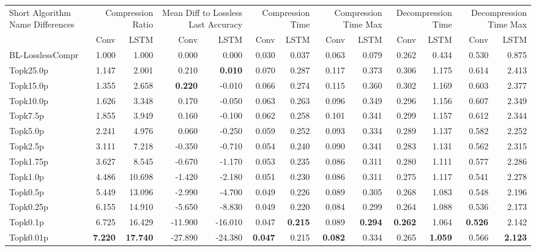 \begin{tabular}{lrrrrrrrrrrrr}
\toprule
\multicolumn{1}{p{2.5cm}}{Short Algorithm Name Differences} & \multicolumn{2}{p{1.8cm}}{Compression Ratio} & \multicolumn{2}{p{1.8cm}}{Mean Diff to Lossless Last Accuracy} & \multicolumn{2}{p{1.8cm}}{Compression Time} & \multicolumn{2}{p{1.8cm}}{Compression Time Max} & \multicolumn{2}{p{1.8cm}}{Decompression Time} & \multicolumn{2}{p{1.8cm}}{Decompression Time Max} \\
 & Conv & LSTM & Conv & LSTM & Conv & LSTM & Conv & LSTM & Conv & LSTM & Conv & LSTM \\
\midrule
BL-LosslessCompr & 1.000 & 1.000 & 0.000 & 0.000 & 0.030 & 0.037 & 0.063 & 0.079 & 0.262 & 0.434 & 0.530 & 0.875 \\
Topk25.0p & 1.147 & 2.001 & 0.210 & \bfseries 0.010 & 0.070 & 0.287 & 0.117 & 0.373 & 0.306 & 1.175 & 0.614 & 2.413 \\
Topk15.0p & 1.355 & 2.658 & \bfseries 0.220 & -0.010 & 0.066 & 0.274 & 0.115 & 0.360 & 0.302 & 1.169 & 0.603 & 2.377 \\
Topk10.0p & 1.626 & 3.348 & 0.170 & -0.050 & 0.063 & 0.263 & 0.096 & 0.349 & 0.296 & 1.156 & 0.607 & 2.349 \\
Topk7.5p & 1.855 & 3.949 & 0.160 & -0.100 & 0.062 & 0.258 & 0.101 & 0.341 & 0.299 & 1.157 & 0.612 & 2.344 \\
Topk5.0p & 2.241 & 4.976 & 0.060 & -0.250 & 0.059 & 0.252 & 0.093 & 0.334 & 0.289 & 1.137 & 0.582 & 2.252 \\
Topk2.5p & 3.111 & 7.218 & -0.350 & -0.710 & 0.054 & 0.240 & 0.090 & 0.341 & 0.283 & 1.131 & 0.562 & 2.315 \\
Topk1.75p & 3.627 & 8.545 & -0.670 & -1.170 & 0.053 & 0.235 & 0.086 & 0.311 & 0.280 & 1.111 & 0.577 & 2.286 \\
Topk1.0p & 4.486 & 10.698 & -1.420 & -2.180 & 0.051 & 0.230 & 0.086 & 0.311 & 0.275 & 1.117 & 0.541 & 2.278 \\
Topk0.5p & 5.449 & 13.096 & -2.990 & -4.700 & 0.049 & 0.226 & 0.089 & 0.305 & 0.268 & 1.083 & 0.548 & 2.196 \\
Topk0.25p & 6.155 & 14.910 & -5.650 & -8.830 & 0.049 & 0.220 & 0.084 & 0.299 & 0.264 & 1.088 & 0.536 & 2.173 \\
Topk0.1p & 6.725 & 16.429 & -11.900 & -16.010 & 0.047 & \bfseries 0.215 & 0.089 & \bfseries 0.294 & \bfseries 0.262 & 1.064 & \bfseries 0.526 & 2.142 \\
Topk0.01p & \bfseries 7.220 & \bfseries 17.740 & -27.890 & -24.380 & \bfseries 0.047 & 0.215 & \bfseries 0.082 & 0.334 & 0.265 & \bfseries 1.059 & 0.566 & \bfseries 2.123 \\
\bottomrule
\end{tabular}
